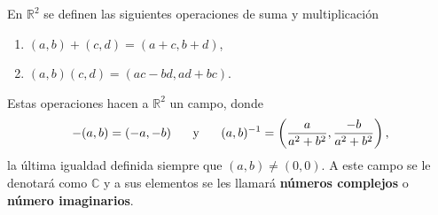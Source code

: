 

\begin{definition}
En $\mathbb{R}^2$ se definen las siguientes operaciones de suma y multiplicación
\begin{enumerate}[label=\textnormal{(\roman*)}]
\item $(a,b) + (c,d) = (a+c, b+d)$,
\item $(a,b) (c,d) = (a c - b d, a d + b c)$.
\end{enumerate}
Estas operaciones hacen a $\mathbb{R}^2$ un campo, donde
\begin{equation*}
    -(a, b) = (-a, -b) \hspace{0.5cm} \text{ y } \hspace{0.5cm} (a,b)^{-1} = \left( \frac{a}{a^2 + b^2}, \frac{-b}{a^2 + b^2} \right),
\end{equation*}
la última igualdad definida siempre que $(a,b) \ne (0,0)$. A este campo se le denotará como $\mathbb{C}$ y a sus elementos se les llamará \textbf{números complejos} o \textbf{número imaginarios}.
\end{definition}
